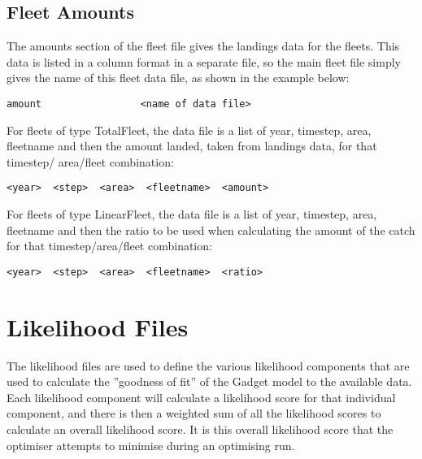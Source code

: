 \documentclass [a4paper, 10pt]{book}
\begin{document}

\section{Fleet Amounts}\label{sec:fleetamount}
The amounts section of the fleet file gives the landings data for the fleets.  This data is listed in a column format in a separate file, so the main fleet file simply gives the name of this fleet data file, as shown in the example below:

{\small\begin{verbatim}
amount                 <name of data file>
\end{verbatim}}

For fleets of type TotalFleet, the data file is a list of year, timestep, area, fleetname and then the amount landed, taken from landings data, for that timestep/ area/fleet combination:

{\small\begin{verbatim}
<year>  <step>  <area>  <fleetname>  <amount>
\end{verbatim}}

For fleets of type LinearFleet, the data file is a list of year, timestep, area, fleetname and then the ratio to be used when calculating the amount of the catch for that timestep/area/fleet combination:

{\small\begin{verbatim}
<year>  <step>  <area>  <fleetname>  <ratio>
\end{verbatim}}

\chapter{Likelihood Files}\label{chap:like}
The likelihood files are used to define the various likelihood components that are used to calculate the ''goodness of fit'' of the Gadget model to the available data.  Each likelihood component will calculate a likelihood score for that individual component, and there is then a weighted sum of all the likelihood scores to calculate an overall likelihood score.  It is this overall likelihood score that the optimiser attempts to minimise during an optimising run.
\end{document}
